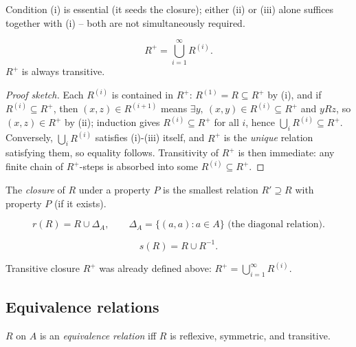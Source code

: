 \documentclass[11pt]{article}
\begin{document}
\begin{note}
Condition (i) is essential (it seeds the closure); either (ii) or (iii) alone suffices together with (i) -- both are not simultaneously required.
\end{note}

\begin{theorem}
\[
R^+ = \bigcup_{i=1}^{\infty} R^{(i)}.
\]
$R^+$ is always transitive.
\end{theorem}
\begin{proof}[Proof sketch]
Each $R^{(i)}$ is contained in $R^+$: $R^{(1)}=R \subseteq R^+$ by (i), and if $R^{(i)} \subseteq R^+$, then $(x,z)\in R^{(i+1)}$ means $\exists y,\ (x,y)\in R^{(i)} \subseteq R^+$ and $yRz$, so $(x,z) \in R^+$ by (ii); induction gives $R^{(i)}\subseteq R^+$ for all $i$, hence $\bigcup_i R^{(i)} \subseteq R^+$. Conversely, $\bigcup_i R^{(i)}$ satisfies (i)-(iii) itself, and $R^+$ is the \emph{unique} relation satisfying them, so equality follows. Transitivity of $R^+$ is then immediate: any finite chain of $R^+$-steps is absorbed into some $R^{(i)} \subseteq R^+$.
\end{proof}

\begin{definition}
The \emph{closure} of $R$ under a property $P$ is the smallest relation $R'\supseteq R$ with property $P$ (if it exists).
\end{definition}

\begin{definition}
\[
r(R) = R \cup \Delta_A, \qquad \Delta_A = \{(a,a):a\in A\} \text{ (the diagonal relation)}.
\]
\end{definition}

\begin{definition}
\[
s(R) = R \cup R^{-1}.
\]
\end{definition}

\begin{note}
Transitive closure $R^+$ was already defined above: $R^+=\bigcup_{i=1}^\infty R^{(i)}$.
\end{note}

\subsection{Equivalence relations}
\label{sec:2-16}

\begin{definition}
$R$ on $A$ is an \emph{equivalence relation} iff $R$ is reflexive, symmetric, and transitive.
\end{definition}
\end{document}
